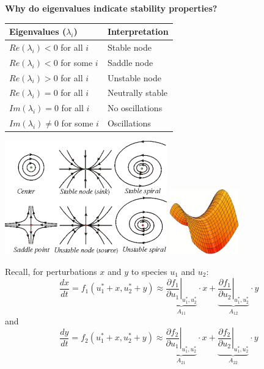 \documentclass{article}
\begin{document}
\textbf{Why do eigenvalues indicate stability properties?}
\begin{center}
\begin{tabular}{ll}
\hline
\textbf{Eigenvalues ($\lambda_i$)} & \textbf{Interpretation} \\ 
\hline
 $Re(\lambda_i)< 0$  for all $i$& Stable node\\ 
  $Re(\lambda_i)< 0$ for some $i$ & Saddle node \\ 
 $Re(\lambda_i)> 0$ for all $i$ & Unstable node \\ 
 $Re(\lambda_i) = 0$ for all $i$ & Neutrally stable \\ 
 \hline
  $Im(\lambda_i) = 0$ for all $i$ & No oscillations \\ 
 $Im(\lambda_i) \neq 0$ for some $i$  & Oscillations \\ 
 \hline
\end{tabular} 
\end{center}
\begin{center}
	\includegraphics[width=7cm]{figs/Points.pdf}
	\includegraphics[width=3cm]{figs/Saddle.pdf}
\end{center}
Recall, for perturbations $x$ and $y$ to species $u_1$ and $u_2$:
\begin{equation*}
	\frac{d x}{dt}=f_1(u_1^* + x, u_2^* + y)\approx \underbrace{\left. \frac{\partial f_1}{\partial u_1}\right|_{u_1^*, u_2^*}}_{A_{11}} \cdot x + \underbrace{\left. \frac{\partial f_1}{\partial u_2}\right|_{u_1^*, u_2^*}}_{A_{12}} \cdot y
\end{equation*}
and
\begin{equation*}
	\frac{d y}{dt}=	f_2(u_1^* + x, u_2^* + y)\approx \underbrace{\left. \frac{\partial f_2}{\partial u_1}\right|_{u_1^*, u_2^*}}_{A_{21}} \cdot x + \underbrace{\left. \frac{\partial f_2}{\partial u_2}\right|_{u_1^*, u_2^*}}_{A_{22}} \cdot y
\end{equation*}
\end{document}

